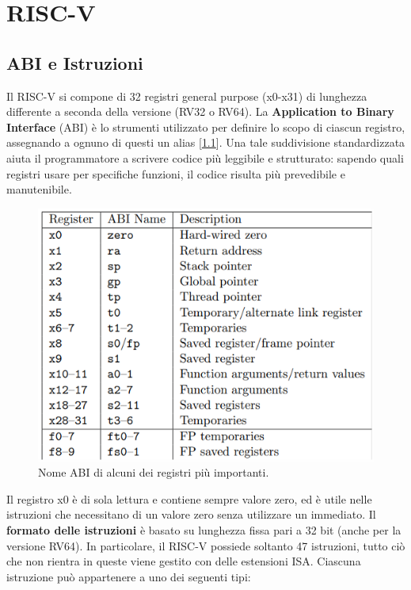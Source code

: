\chapter{RISC-V}

\section{ABI e Istruzioni}
Il RISC-V si compone di 32 registri general purpose (x0-x31) di lunghezza differente a seconda della versione (RV32 o RV64). La \textbf{Application to Binary Interface} (ABI) è lo strumenti utilizzato per definire lo scopo di ciascun registro, assegnando a ognuno di questi un alias [\ref{fig:abi}]. Una tale suddivisione standardizzata aiuta il programmatore a scrivere codice più leggibile e strutturato: sapendo quali registri usare per specifiche funzioni, il codice risulta più prevedibile e manutenibile. 
\begin{figure}[!h]
	\centering
	\includegraphics[width=0.5\linewidth]{img/abi}
	\caption{Nome ABI di alcuni dei registri più importanti.}
	\label{fig:abi}
\end{figure}
Il registro x0 è di sola lettura e contiene sempre valore zero, ed è utile nelle istruzioni che necessitano di un valore zero senza utilizzare un immediato. Il \textbf{formato delle istruzioni} è basato su lunghezza fissa pari a 32 bit (anche per la versione RV64). In particolare, il RISC-V possiede soltanto 47 istruzioni, tutto ciò che non rientra in queste viene gestito con delle estensioni ISA. Ciascuna istruzione può appartenere a uno dei seguenti tipi:
